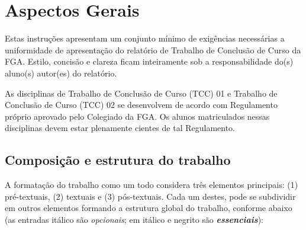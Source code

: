 \chapter[Aspectos Gerais]{Aspectos Gerais}

Estas instruções apresentam um conjunto mínimo de exigências necessárias a 
uniformidade de apresentação do relatório de Trabalho de Conclusão de Curso 
da FGA. Estilo, concisão e clareza ficam inteiramente sob a 
responsabilidade do(s) aluno(s) autor(es) do relatório.

As disciplinas de Trabalho de Conclusão de Curso (TCC) 01 e Trabalho de 
Conclusão de Curso (TCC) 02 se desenvolvem de acordo com Regulamento 
próprio aprovado pelo Colegiado da FGA. Os alunos matriculados nessas 
disciplinas devem estar plenamente cientes de tal Regulamento. 

\section{Composição e estrutura do trabalho}

A formatação do trabalho como um todo considera três elementos principais: 
(1) pré-textuais, (2) textuais e (3) pós-textuais. Cada um destes, pode se 
subdividir em outros elementos formando a estrutura global do trabalho, 
conforme abaixo (as entradas itálico são \textit{opcionais}; em itálico e
negrito são \textbf{\textit{essenciais}}):

